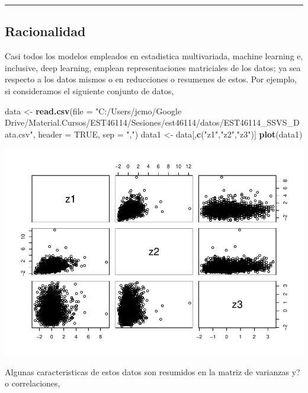 \documentclass[11pt,]{article}
\newenvironment{Shaded}{\begin{snugshade}}{\end{snugshade}}
\newcommand{\KeywordTok}[1]{\textcolor[rgb]{0.13,0.29,0.53}{\textbf{#1}}}
\newcommand{\DataTypeTok}[1]{\textcolor[rgb]{0.13,0.29,0.53}{#1}}
\newcommand{\StringTok}[1]{\textcolor[rgb]{0.31,0.60,0.02}{#1}}
\newcommand{\OtherTok}[1]{\textcolor[rgb]{0.56,0.35,0.01}{#1}}
\newcommand{\NormalTok}[1]{#1}
\begin{document}
\begin{center}\rule{0.5\linewidth}{\linethickness}\end{center}

\subsection{Racionalidad}\label{racionalidad}

Casi todos los modelos empleados en estadistica multivariada, machine
learning e, inclusive, deep learning, emplean representaciones
matriciales de los datos; ya sea respecto a los datos mismos o en
reducciones o resumenes de estos. Por ejemplo, si consideramos el
siguiente conjunto de datos,

\begin{Shaded}
\begin{Highlighting}[]
\NormalTok{data <-}\StringTok{ }\KeywordTok{read.csv}\NormalTok{(}\DataTypeTok{file =} \StringTok{"C:/Users/jcmo/Google Drive/Material.Cursos/EST46114/Sesiones/est46114/datos/EST46114_SSVS_Data.csv"}\NormalTok{, }
                 \DataTypeTok{header =} \OtherTok{TRUE}\NormalTok{, }\DataTypeTok{sep =} \StringTok{","}\NormalTok{)}
\NormalTok{data1 <-}\StringTok{ }\NormalTok{data[,}\KeywordTok{c}\NormalTok{(}\StringTok{"z1"}\NormalTok{,}\StringTok{"z2"}\NormalTok{,}\StringTok{"z3"}\NormalTok{)]}
\KeywordTok{plot}\NormalTok{(data1)}
\end{Highlighting}
\end{Shaded}

\includegraphics{est46114_s01_matrixops_svm_files/figure-latex/unnamed-chunk-1-1.pdf}

Algunas caracteristicas de estos datos son resumidos en la matriz de
varianzas y?o correlaciones,
\end{document}
